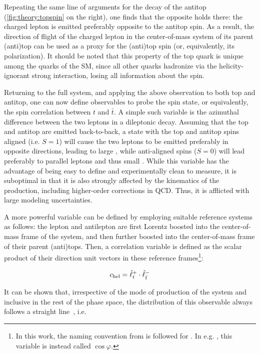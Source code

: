 Repeating the same line of arguments for the decay of the antitop (\cref{fig:theory:topspin} on the right), one finds that the opposite holds there: the charged lepton is emitted preferably opposite to the antitop spin. As a result, the direction of flight of the charged lepton in the center-of-mass system of its parent (anti)top can be used as a proxy for the (anti)top spin (or, equivalently, its polarization). It should be noted that this property of the top quark is unique among the quarks of the SM, since all other quarks hadronize via the helicity-ignorant strong interaction, losing all information about the spin.

Returning to the full \ttbar system, and applying the above observation to both top and antitop, one can now define observables to probe the \ttbar spin state, or equivalently, the spin correlation between $t$ and $\bar{t}$. A simple such variable is the azimuthal difference \dphill between the two leptons in a dileptonic decay. Assuming that the top and antitop are emitted back-to-back, a state with the top and antitop spins aligned (i.e. $S=1$) will cause the two leptons to be emitted preferably in opposite directions, leading to large \dphill, while anti-aligned spins ($S=0$) will lead preferably to parallel leptons and thus small \dphill. While this variable has the advantage of being easy to define and experimentally clean to measure, it is suboptimal in that it is also strongly affected by the kinematics of the \ttbar production, including higher-order corrections in QCD. Thus, it is afflicted with large modeling uncertainties.

A more powerful variable can be defined by employing suitable reference systems as follows: the lepton and antilepton are first Lorentz boosted into the center-of-mass frame of the \ttbar system, and then further boosted into the center-of-mass frame of their parent (anti)tops. Then, a correlation variable \chel is defined as the scalar product of their direction unit vectors in these reference frames\footnote{
In this work, the naming convention from  is followed for \chel. In e.g. , this variable is instead called $\cos \varphi$.
}:

\begin{equation}
\label{eq:theory:cheldef}
    c_{\mathrm{hel}} = \hat{\ell}^+_{t} \cdot \hat{\ell}^-_{\bar{t}} 
\end{equation}

It can be shown that, irrespective of the mode of production of the \ttbar system and inclusive in the rest of the phase space, the distribution of this observable always follows a straight line~\cite{Bernreuther:2004jv}, i.e.

